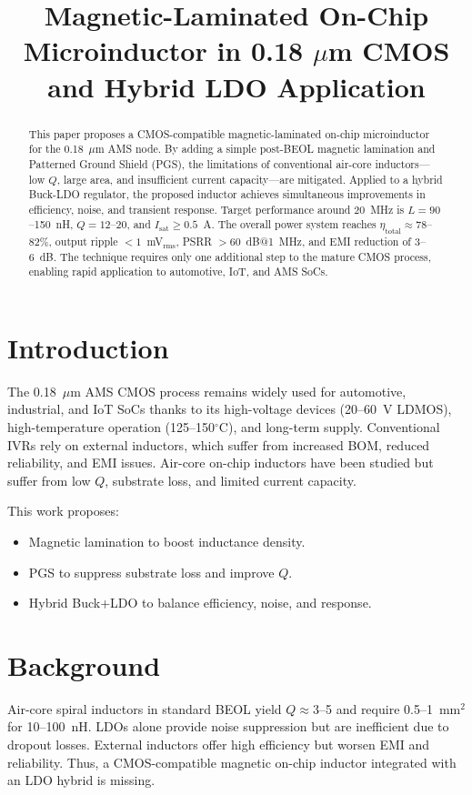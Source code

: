\documentclass[conference]{IEEEtran}
\title{Magnetic-Laminated On-Chip Microinductor in 0.18 $\mu$m CMOS and Hybrid LDO Application}
\author{
  \IEEEauthorblockN{Shinichi Samizo}
  \IEEEauthorblockA{Independent Researcher\\
  Project Design Hub, Japan\\
  Email: samizo@example.com}
}
\begin{document}
\maketitle

\begin{abstract}
This paper proposes a CMOS-compatible magnetic-laminated on-chip microinductor for the 0.18~$\mu$m AMS node. 
By adding a simple post-BEOL magnetic lamination and Patterned Ground Shield (PGS), the limitations of conventional air-core inductors---low $Q$, large area, and insufficient current capacity---are mitigated. 
Applied to a hybrid Buck-LDO regulator, the proposed inductor achieves simultaneous improvements in efficiency, noise, and transient response. 
Target performance around 20~MHz is $L=90$--150~nH, $Q=12$--20, and $I_{\mathrm{sat}}\ge0.5$~A. 
The overall power system reaches $\eta_{\mathrm{total}}\approx 78$--82\%, output ripple $<1$~mV$_{\mathrm{rms}}$, PSRR $>60$~dB@1~MHz, and EMI reduction of 3--6~dB. 
The technique requires only one additional step to the mature CMOS process, enabling rapid application to automotive, IoT, and AMS SoCs.
\end{abstract}

\section{Introduction}
The 0.18~$\mu$m AMS CMOS process remains widely used for automotive, industrial, and IoT SoCs thanks to its high-voltage devices (20--60~V LDMOS), high-temperature operation (125--150$^\circ$C), and long-term supply. 
Conventional IVRs rely on external inductors, which suffer from increased BOM, reduced reliability, and EMI issues. 
Air-core on-chip inductors have been studied but suffer from low $Q$, substrate loss, and limited current capacity. 

This work proposes:
\begin{itemize}
    \item Magnetic lamination to boost inductance density.
    \item PGS to suppress substrate loss and improve $Q$.
    \item Hybrid Buck+LDO to balance efficiency, noise, and response.
\end{itemize}

\section{Background}
Air-core spiral inductors in standard BEOL yield $Q \approx 3$--5 and require 0.5--1~mm$^2$ for 10--100~nH. 
LDOs alone provide noise suppression but are inefficient due to dropout losses. 
External inductors offer high efficiency but worsen EMI and reliability. 
Thus, a CMOS-compatible magnetic on-chip inductor integrated with an LDO hybrid is missing.
\end{document}
